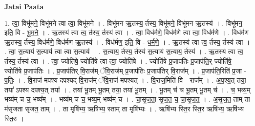 \documentclass[17pt]{extarticle}
\begin{document}
\textbf{Jatai Paata} \newline

1. त्वा॒ विभू॑मने॒ विभू॑मने त्वा त्वा॒ विभू॑मने । . विभू॑मन ऋ॒तस्य॒ र्तस्य॒ विभू॑मने॒ विभू॑मन ऋ॒तस्य॑ । . विभू॑मन॒ इति॒ वि - भू॒म॒ने॒ । . ऋ॒तस्य॑ त्वा त्व॒ र्तस्य॒ र्तस्य॑ त्वा । . त्वा॒ विध॑र्मणे॒ विध॑र्मणे त्वा त्वा॒ विध॑र्मणे । . विध॑र्मण ऋ॒तस्य॒ र्तस्य॒ विध॑र्मणे॒ विध॑र्मण ऋ॒तस्य॑ । . विध॑र्मण॒ इति॒ वि - ध॒र्म॒णे॒ । . ऋ॒तस्य॑ त्वा त्व॒ र्तस्य॒ र्तस्य॑ त्वा । . त्वा॒ स॒त्याय॑ स॒त्याय॑ त्वा त्वा स॒त्याय॑ । . स॒त्याय॒ र्तस्य॒ र्तस्य॑ स॒त्याय॑ स॒त्याय॒ र्तस्य॑ । . ऋ॒तस्य॑ त्वा त्व॒ र्तस्य॒ र्तस्य॑ त्वा । . त्वा॒ ज्योति॑षे॒ ज्योति॑षे त्वा त्वा॒ ज्योति॑षे । . ज्योति॑षे प्र॒जाप॑तिः प्र॒जाप॑ति॒र् ज्योति॑षे॒ ज्योति॑षे प्र॒जाप॑तिः । . प्र॒जाप॑तिर् वि॒राज॑म् ॅवि॒राज॑म् प्र॒जाप॑तिः प्र॒जाप॑तिर् वि॒राज᳚म् । . प्र॒जाप॑ति॒रिति॑ प्र॒जा - प॒तिः॒ । . वि॒राज॑ मपश्य दपश्यद् वि॒राज॑म् ॅवि॒राज॑ मपश्यत् । . वि॒राज॒मिति॑ वि - राज᳚म् । . अ॒प॒श्य॒त् तया॒ तया॑ ऽपश्य दपश्य॒त् तया᳚ । . तया॑ भू॒तम् भू॒तम् तया॒ तया॑ भू॒तम् । . भू॒तम् च॑ च भू॒तम् भू॒तम् च॑ । . च॒ भव्य॒म् भव्य॑म् च च॒ भव्य᳚म् । . भव्य॑म् च च॒ भव्य॒म् भव्य॑म् च । . चा॒सृ॒ज॒ता॒ सृ॒ज॒त॒ च॒ चा॒सृ॒ज॒त॒ । . अ॒सृ॒ज॒त॒ ताम् ता म॑सृजता सृजत॒ ताम् । . ता मृषि॑भ्य॒ ऋषि॑भ्य॒ स्ताम् ता मृषि॑भ्यः । . ऋषि॑भ्य स्ति॒र स्ति॒र ऋषि॑भ्य॒ ऋषि॑भ्य स्ति॒रः । \newline
\end{document}
